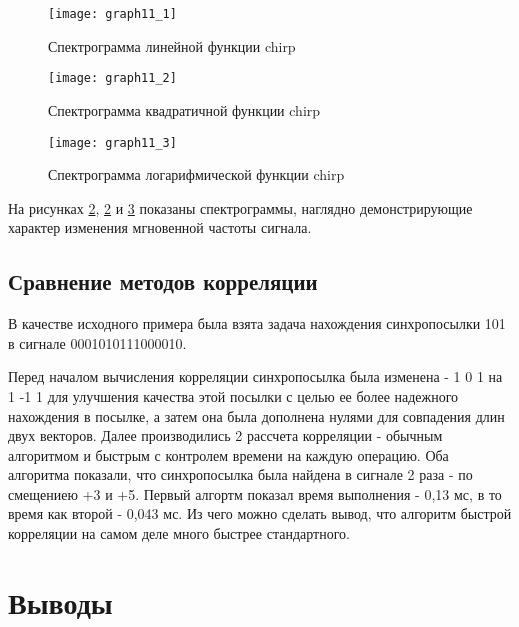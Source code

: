 \begin{figure}[H]
	\begin{center}
		\texttt{[image: graph11\_1]}
		\caption{Спектрограмма линейной функции chirp} 
		\label{pic:graph11_1} %
	\end{center}
\end{figure}
\begin{figure}[H]
	\begin{center}
		\texttt{[image: graph11\_2]}
		\caption{Спектрограмма квадратичной функции chirp} 
		\label{pic:graph11_2} %
	\end{center}
\end{figure}
\begin{figure}[H]
	\begin{center}
		\texttt{[image: graph11\_3]}
		\caption{Спектрограмма логарифмической функции chirp} 
		\label{pic:graph11_3} %
	\end{center}
\end{figure}
На рисунках \ref{pic:graph11_2}, \ref{pic:graph11_2} и \ref{pic:graph11_3} показаны спектрограммы, наглядно демонстрирующие характер изменения мгновенной частоты сигнала.

\subsection{Сравнение методов корреляции}
В качестве исходного примера была взята задача нахождения синхропосылки 101 в сигнале 0001010111000010.

\parindent=1cm
Перед началом вычисления корреляции синхропосылка была изменена - 1 0 1 на 1 -1 1 для улучшения качества этой посылки с целью ее более надежного нахождения в посылке, а затем она была дополнена нулями для совпадения длин двух векторов. 
Далее производились 2 рассчета корреляции - обычным алгоритмом и быстрым с контролем времени на каждую операцию.
Оба алгоритма показали, что синхропосылка была найдена в сигнале 2 раза - по смещениею +3 и +5. 
Первый алгортм показал время выполнения - 0,13 мс, в то время как второй - 0,043 мс. Из чего можно сделать вывод, что алгоритм быстрой корреляции на самом деле много быстрее стандартного.

\section{Выводы}

